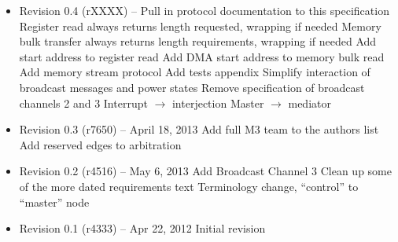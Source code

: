 \documentclass[twoside]{article}
\begin{document}
\begin{itemize}

\item Revision 0.4 {\footnotesize(rXXXX)} --
  \subitem Pull in protocol documentation to this specification
  \subitem Register read always returns length requested, wrapping if needed
  \subitem Memory bulk transfer always returns length requirements, wrapping
  if needed
  \subitem Add start address to register read
  \subitem Add DMA start address to memory bulk read
  \subitem Add memory stream protocol
  \subitem Add tests appendix
  \subitem Simplify interaction of broadcast messages and power states
  \subitem Remove specification of broadcast channels 2 and 3
  \subitem Interrupt $\rightarrow$ interjection
  \subitem Master $\rightarrow$ mediator

\item Revision 0.3 {\footnotesize(r7650)} -- April 18, 2013
\subitem Add full M3 team to the authors list
\subitem Add reserved edges to arbitration

\item Revision 0.2 {\footnotesize(r4516)} -- May 6, 2013
\subitem Add Broadcast Channel 3
\subitem Clean up some of the more dated requirements text
\subitem Terminology change, ``control'' to ``master'' node

\item Revision 0.1 {\footnotesize(r4333)} -- Apr 22, 2012
\subitem Initial revision

\end{itemize}

\clearpage
\appendix




\end{document}
